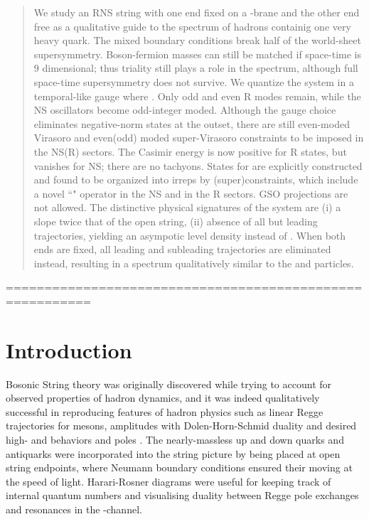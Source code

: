 \documentclass[a4paper,a4paper]{article}
\begin{document}
\begin{titlepage}
\begin{abstract}
 We study an RNS string with one end fixed on a \coordHE{}-brane and
the other end free as a qualitative guide to the spectrum of
hadrons containig one very heavy quark. The mixed boundary
conditions break half of the world-sheet supersymmetry.
Boson-fermion masses can still be matched if space-time is 9
dimensional; thus \coordHE{} triality still plays a role in the
spectrum, although full space-time supersymmetry does not survive.
We quantize the system in a temporal-like gauge where \coordHE{}.  Only odd \myHighlight{$\alpha$}\coordHE{} and even \coordHE{} R modes remain, while the
NS oscillators \coordHE{} become odd-integer moded.  Although the gauge
choice eliminates negative-norm states at the outset, there are
still even-moded Virasoro and even(odd) moded super-Virasoro
constraints to be imposed in the NS(R) sectors. The Casimir energy
is now positive for R states, but vanishes for NS; there are no
tachyons. States for \coordHE{} are explicitly
constructed and found to be organized into \coordHE{} irreps by
(super)constraints, which include a novel ``\coordHE{}" operator
in the NS and \coordHE{} in the R sectors. GSO projections
are not allowed.  The distinctive physical signatures of the
system are (i) a slope twice that of the open string, (ii) absence
of all but leading trajectories, yielding an asympotic level
density \coordHE{} instead of \coordHE{}. When
both ends are fixed, all leading and subleading trajectories are
eliminated instead, resulting in a spectrum qualitatively similar
to the \coordHE{} and \myHighlight{$\Upsilon$}\coordHE{} particles.

\end{abstract}=========================================================


\end{titlepage}


\section{Introduction}


Bosonic String theory was originally discovered  \cite{Nambu,
Susskind} while trying to account for observed properties of
hadron dynamics, and it was indeed qualitatively successful in
reproducing features of hadron physics such as linear Regge
trajectories for mesons, amplitudes with Dolen-Horn-Schmid duality
\cite{Dolen} and desired high-\coordHE{} and \coordHE{} behaviors and poles
\cite{Ven}. The nearly-massless up and down quarks and antiquarks
were incorporated into the string picture by being placed at open
string endpoints, where Neumann boundary conditions ensured their
moving at the speed of light.  Harari-Rosner diagrams
\cite{Har,Ros} were useful for keeping track of internal quantum
numbers and visualising duality between Regge pole exchanges and
resonances in the \coordHE{}-channel.
\end{document}
